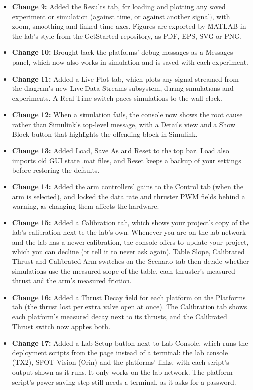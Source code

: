 \documentclass[11pt]{article}
\begin{document}
\begin{itemize}[label={\textcolor{primaryColor}{\textbullet}}]
    \item \textbf{Change 9:} Added the Results tab, for loading and plotting any saved experiment or simulation (against time, or against another signal), with zoom, smoothing and linked time axes. Figures are exported by MATLAB in the lab's style from the GetStarted repository, as PDF, EPS, SVG or PNG.
    \item \textbf{Change 10:} Brought back the platforms' debug messages as a Messages panel, which now also works in simulation and is saved with each experiment.
    \item \textbf{Change 11:} Added a Live Plot tab, which plots any signal streamed from the diagram's new Live Data Streams subsystem, during simulations and experiments. A Real Time switch paces simulations to the wall clock.
    \item \textbf{Change 12:} When a simulation fails, the console now shows the root cause rather than Simulink's top-level message, with a Details view and a Show Block button that highlights the offending block in Simulink.
    \item \textbf{Change 13:} Added Load, Save As and Reset to the top bar. Load also imports old GUI state .mat files, and Reset keeps a backup of your settings before restoring the defaults.
    \item \textbf{Change 14:} Added the arm controllers' gains to the Control tab (when the arm is selected), and locked the data rate and thruster PWM fields behind a warning, as changing them affects the hardware.
    \item \textbf{Change 15:} Added a Calibration tab, which shows your project's copy of the lab's calibration next to the lab's own. Whenever you are on the lab network and the lab has a newer calibration, the console offers to update your project, which you can decline (or tell it to never ask again). Table Slope, Calibrated Thrust and Calibrated Arm switches on the Scenario tab then decide whether simulations use the measured slope of the table, each thruster's measured thrust and the arm's measured friction.
    \item \textbf{Change 16:} Added a Thrust Decay field for each platform on the Platforms tab (the thrust lost per extra valve open at once). The Calibration tab shows each platform's measured decay next to its thrusts, and the Calibrated Thrust switch now applies both.
    \item \textbf{Change 17:} Added a Lab Setup button next to Lab Console, which runs the deployment scripts from the page instead of a terminal: the lab console (TX2), SPOT Vision (Orin) and the platforms' links, with each script's output shown as it runs. It only works on the lab network. The platform script's power-saving step still needs a terminal, as it asks for a password.

\end{itemize}
\end{document}
